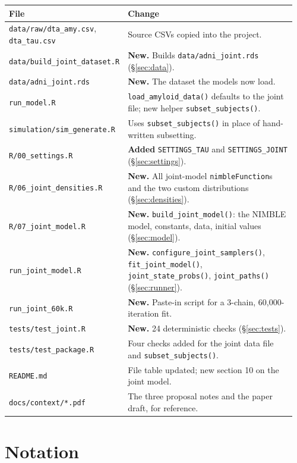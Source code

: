 \documentclass[11pt]{article}
\newcommand{\code}[1]{\texttt{#1}}
\begin{document}
\begin{longtable}{@{}p{0.34\linewidth}p{0.62\linewidth}@{}}
\toprule
File & Change \\
\midrule
\endhead
\code{data/raw/dta\_amy.csv}, \code{dta\_tau.csv} & Source CSVs copied into the project. \\
\code{data/build\_joint\_dataset.R} & \textbf{New.} Builds \code{data/adni\_joint.rds} (\S\ref{sec:data}). \\
\code{data/adni\_joint.rds} & \textbf{New.} The dataset the models now load. \\
\code{run\_model.R} & \code{load\_amyloid\_data()} defaults to the joint file; new helper \code{subset\_subjects()}. \\
\code{simulation/sim\_generate.R} & Uses \code{subset\_subjects()} in place of hand-written subsetting. \\
\code{R/00\_settings.R} & \textbf{Added} \code{SETTINGS\_TAU} and \code{SETTINGS\_JOINT} (\S\ref{sec:settings}). \\
\code{R/06\_joint\_densities.R} & \textbf{New.} All joint-model \code{nimbleFunction}s and the two custom distributions (\S\ref{sec:densities}). \\
\code{R/07\_joint\_model.R} & \textbf{New.} \code{build\_joint\_model()}: the NIMBLE model, constants, data, initial values (\S\ref{sec:model}). \\
\code{run\_joint\_model.R} & \textbf{New.} \code{configure\_joint\_samplers()}, \code{fit\_joint\_model()}, \code{joint\_state\_probs()}, \code{joint\_paths()} (\S\ref{sec:runner}). \\
\code{run\_joint\_60k.R} & \textbf{New.} Paste-in script for a 3-chain, 60{,}000-iteration fit. \\
\code{tests/test\_joint.R} & \textbf{New.} 24 deterministic checks (\S\ref{sec:tests}). \\
\code{tests/test\_package.R} & Four checks added for the joint data file and \code{subset\_subjects()}. \\
\code{README.md} & File table updated; new section 10 on the joint model. \\
\code{docs/context/*.pdf} & The three proposal notes and the paper draft, for reference. \\
\bottomrule
\end{longtable}

\section{Notation}
\end{document}
